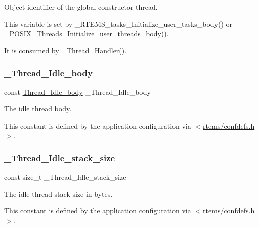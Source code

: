 Object identifier of the global constructor thread. 

This variable is set by \+\_\+\+R\+T\+E\+M\+S\+\_\+tasks\+\_\+\+Initialize\+\_\+user\+\_\+tasks\+\_\+body() or \+\_\+\+P\+O\+S\+I\+X\+\_\+\+Threads\+\_\+\+Initialize\+\_\+user\+\_\+threads\+\_\+body().

It is consumed by \mbox{\hyperlink{group__RTEMSScoreThread_gae0c3a615798c7cc70dc9ff6d9317df46}{\+\_\+\+Thread\+\_\+\+Handler()}}. \mbox{\label{group__RTEMSScoreThread_ga7db3304111f98acc3634f7cc04dcff2f}} 
\subsubsection{\texorpdfstring{\_Thread\_Idle\_body}{\_Thread\_Idle\_body}}
{\footnotesize\ttfamily const \mbox{\hyperlink{group__RTEMSScoreThread_ga45e6fd0b5cd35ee2ea9e36be90a84c1b}{Thread\+\_\+\+Idle\+\_\+body}} \+\_\+\+Thread\+\_\+\+Idle\+\_\+body}



The idle thread body. 

This constant is defined by the application configuration via $<$\mbox{\hyperlink{confdefs_8h}{rtems/confdefs.\+h}}$>$. \mbox{\label{group__RTEMSScoreThread_gacc61cd772951a83d83af82eba3ff4613}} 
\subsubsection{\texorpdfstring{\_Thread\_Idle\_stack\_size}{\_Thread\_Idle\_stack\_size}}
{\footnotesize\ttfamily const size\+\_\+t \+\_\+\+Thread\+\_\+\+Idle\+\_\+stack\+\_\+size}



The idle thread stack size in bytes. 

This constant is defined by the application configuration via $<$\mbox{\hyperlink{confdefs_8h}{rtems/confdefs.\+h}}$>$. \mbox{\label{group__RTEMSScoreThread_gac8376902a32f888326684fc14078057c}} 

